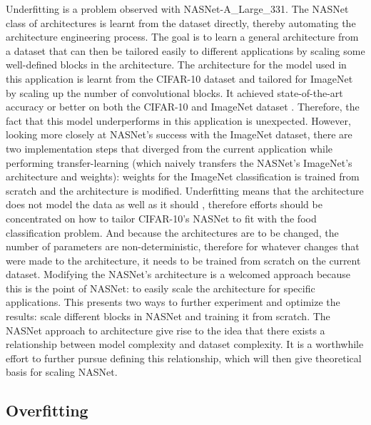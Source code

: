 \documentclass[a4paper]{article}
\begin{document}
Underfitting is a problem observed with NASNet-A\_Large\_331. The NASNet class of architectures is learnt from the dataset directly, thereby automating the architecture engineering process. The goal is to learn a general architecture from a dataset that can then be tailored easily to different applications by scaling some well-defined blocks in the architecture. The architecture for the model used in this application is learnt from the CIFAR-10 dataset and tailored for ImageNet by scaling up the number of convolutional blocks. It achieved state-of-the-art accuracy or better on both the CIFAR-10 and ImageNet dataset \cite{Zoph2017}. Therefore, the fact that this model underperforms in this application is unexpected. However, looking more closely at NASNet's success with the ImageNet dataset, there are two implementation steps that diverged from the current application while performing transfer-learning (which naively transfers the NASNet's ImageNet's architecture and weights): weights for the ImageNet classification is trained from scratch and the architecture is modified. Underfitting means that the architecture does not model the data as well as it should \cite{Patterson2017}, therefore efforts should be concentrated on how to tailor CIFAR-10's NASNet to fit with the food classification problem. And because the architectures are to be changed, the number of parameters are non-deterministic, therefore for whatever changes that were made to the architecture, it needs to be trained from scratch on the current dataset. Modifying the NASNet's architecture is a welcomed approach because this is the point of NASNet: to easily scale the architecture for specific applications. This presents two ways to further experiment and optimize the results: scale different blocks in NASNet and training it from scratch. The NASNet approach to architecture give rise to the idea that there exists a relationship between model complexity and dataset complexity. It is a worthwhile effort to further pursue defining this relationship, which will then give theoretical basis for scaling NASNet.

\subsection{Overfitting}
\end{document}

